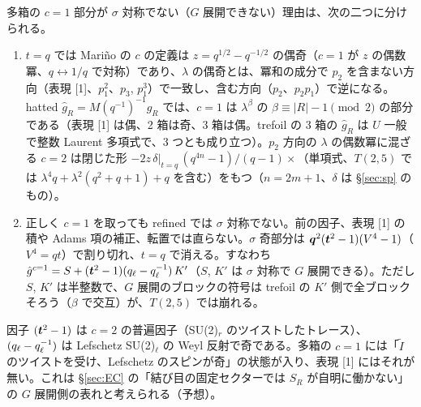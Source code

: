 多箱の $c = 1$ 部分が $\sigma$ 対称でない（$G$ 展開できない）理由は、次の二つに分けられる。
\begin{compresult}\label{cr:multibox-sigma}
\begin{enumerate}
\item $t = q$ では Mariño の $c$ の定義は $z = q^{1/2} - q^{-1/2}$ の偶奇（$c = 1$ が $z$ の偶数冪、$q \leftrightarrow 1/q$ で対称）であり、$\lambda$ の偶奇とは、冪和の成分で $p_2$ を含まない方向（表現 [1]、$p_1^2$、$p_3$, $p_1^3$）で一致し、含む方向（$p_2$、$p_2 p_1$）で逆になる。hatted $\hat g_R = M(q^{-1})^{-1} g_R$ では、$c = 1$ は $\lambda^\beta$ の $\beta \equiv |R| - 1 \pmod 2$ の部分である（表現 [1] は偶、2 箱は奇、3 箱は偶。trefoil の 3 箱の $\hat g_R$ は $U$ 一般で整数 Laurent 多項式で、3 つとも成り立つ）。$p_2$ 方向の $\lambda$ の偶数冪に混ざる $c = 2$ は閉じた形 $-2 z\,\delta|_{t=q}\,(q^{4n}-1)/(q-1) \times$（単項式、$T(2,5)$ では $\lambda^4 q + \lambda^2(q^2+q+1) + q$ を含む）をもつ（$n = 2m+1$、$\delta$ は \S\ref{sec:sp} のもの）。
\item 正しく $c = 1$ を取っても refined では $\sigma$ 対称でない。前の因子、表現 [1] の積や Adams 項の補正、転置では直らない。$\sigma$ 奇部分は $\bm{q}^2(\bm{t}^2 - 1)(V^4 - 1)$（$V^4 = qt$）で割り切れ、$t = q$ で消える。すなわち $\hat g^{c=1} = S + (\bm{t}^2-1)(q_\ell - q_\ell^{-1})\,K'$（$S$, $K'$ は $\sigma$ 対称で $G$ 展開できる）。ただし $S$, $K'$ は半整数で、$G$ 展開のブロックの符号は trefoil の $K'$ 側で全ブロックそろう（$\beta$ で交互）が、$T(2,5)$ では崩れる。
\end{enumerate}
\end{compresult}
因子 $(\bm{t}^2 - 1)$ は $c = 2$ の普遍因子（SU(2)$_r$ のツイストしたトレース）、$(q_\ell - q_\ell^{-1})$ は Lefschetz SU(2)$_\ell$ の Weyl 反射で奇である。多箱の $c = 1$ には「$\tilde I$ のツイストを受け、Lefschetz のスピンが奇」の状態が入り、表現 [1] にはそれが無い。これは \S\ref{sec:EC} の「結び目の固定セクターでは $S_R$ が自明に働かない」の $G$ 展開側の表れと考えられる（予想）。

